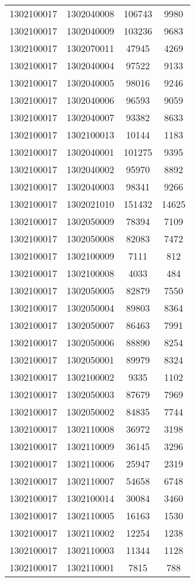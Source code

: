 \begin{longtable}{llcc}
1302100017 & 1302040008 & 106743 & 9980\\
1302100017 & 1302040009 & 103236 & 9683\\
1302100017 & 1302070011 & 47945 & 4269\\
1302100017 & 1302040004 & 97522 & 9133\\
1302100017 & 1302040005 & 98016 & 9246\\
1302100017 & 1302040006 & 96593 & 9059\\
1302100017 & 1302040007 & 93382 & 8633\\
1302100017 & 1302100013 & 10144 & 1183\\
1302100017 & 1302040001 & 101275 & 9395\\
1302100017 & 1302040002 & 95970 & 8892\\
1302100017 & 1302040003 & 98341 & 9266\\
1302100017 & 1302021010 & 151432 & 14625\\
1302100017 & 1302050009 & 78394 & 7109\\
1302100017 & 1302050008 & 82083 & 7472\\
1302100017 & 1302100009 & 7111 & 812\\
1302100017 & 1302100008 & 4033 & 484\\
1302100017 & 1302050005 & 82879 & 7550\\
1302100017 & 1302050004 & 89803 & 8364\\
1302100017 & 1302050007 & 86463 & 7991\\
1302100017 & 1302050006 & 88890 & 8254\\
1302100017 & 1302050001 & 89979 & 8324\\
1302100017 & 1302100002 & 9335 & 1102\\
1302100017 & 1302050003 & 87679 & 7969\\
1302100017 & 1302050002 & 84835 & 7744\\
1302100017 & 1302110008 & 36972 & 3198\\
1302100017 & 1302110009 & 36145 & 3296\\
1302100017 & 1302110006 & 25947 & 2319\\
1302100017 & 1302110007 & 54658 & 6748\\
1302100017 & 1302100014 & 30084 & 3460\\
1302100017 & 1302110005 & 16163 & 1530\\
1302100017 & 1302110002 & 12254 & 1238\\
1302100017 & 1302110003 & 11344 & 1128\\
1302100017 & 1302110001 & 7815 & 788\\

\end{longtable}
